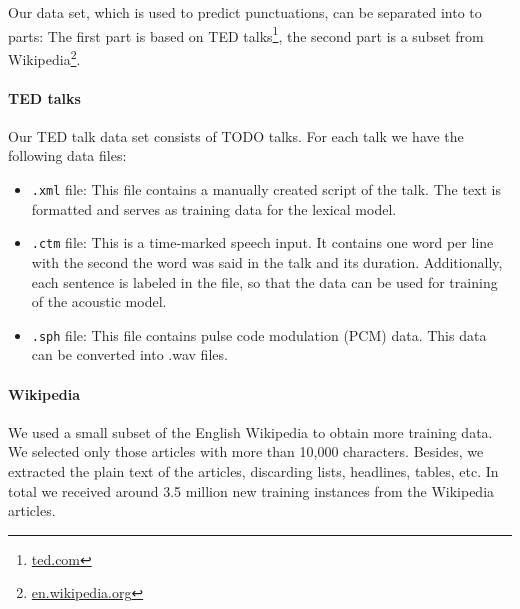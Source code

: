 
Our data set, which is used to predict punctuations, can be separated into to parts:
The first part is based on TED talks\footnote{\url{ted.com}}, the second part is a subset from Wikipedia\footnote{\url{en.wikipedia.org}}.

\paragraph{TED talks} Our TED talk data set consists of TODO talks. For each talk we have the following data files:
\begin{itemize}
	\item \texttt{.xml} file: This file contains a manually created script of the talk.
	The text is formatted and serves as training data for the lexical model.
	\item \texttt{.ctm} file: This is a time-marked speech input.
	It contains one word per line with the second the word was said in the talk and its duration.
	Additionally, each sentence is labeled in the file, so that the data can be used for training of the acoustic model.
	\item \texttt{.sph} file: This file contains pulse code modulation (PCM) data.
	This data can be converted into .wav files.
\end{itemize}

\paragraph{Wikipedia} We used a small subset of the English Wikipedia to obtain more training data.
We selected only those articles with more than 10,000 characters.
Besides, we extracted the plain text of the articles, discarding lists, headlines, tables, etc.
In total we received around 3.5 million new training instances from the Wikipedia articles.
